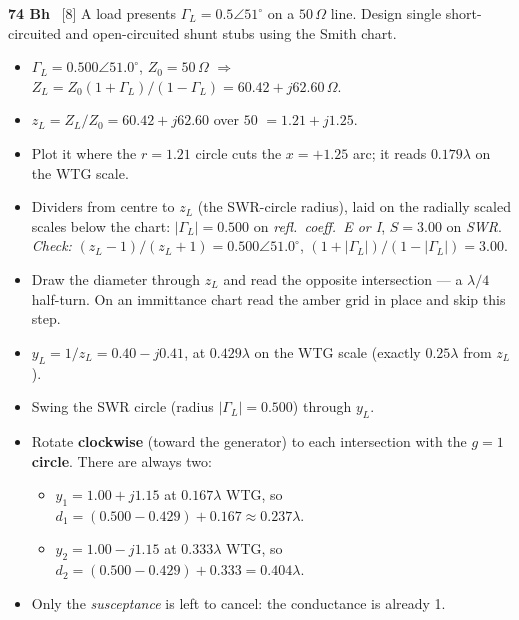 \begin{asked}{\textbf{74 Bh} \ [8]}
A load presents $\Gamma_L = 0.5\angle 51^\circ$ on a $50\,\Omega$ line. Design single short-circuited and open-circuited shunt stubs using the Smith chart.
\end{asked}
\begin{itemize}
  \item $\Gamma_L = 0.500\angle 51.0^\circ$, $Z_0 = 50\,\Omega$ $\Rightarrow$ $Z_L = Z_0(1+\Gamma_L)/(1-\Gamma_L) = 60.42 + j62.60\,\Omega$.
\end{itemize}
\begin{itemize}
  \item $z_L = Z_L/Z_0 = 60.42 + j62.60$ over $50$ $=1.21 + j1.25$.
  \item Plot it where the $r = 1.21$ circle cuts the $x = +1.25$ arc; it reads $0.179\lambda$ on the WTG scale.
  \item Dividers from centre to $z_L$ (the SWR-circle radius), laid on the radially scaled scales below the chart: $|\Gamma_L| = 0.500$ on \emph{refl.\ coeff.\ E or I}, $S = 3.00$ on \emph{SWR}. \textit{Check:} $(z_L-1)/(z_L+1) = 0.500\angle 51.0^\circ$, $(1+|\Gamma_L|)/(1-|\Gamma_L|) = 3.00$.
\end{itemize}
\begin{itemize}
  \item Draw the diameter through $z_L$ and read the opposite intersection --- a $\lambda/4$ half-turn. On an immittance chart read the amber grid in place and skip this step.
  \item $y_L = 1/z_L = 0.40 - j0.41$, at $0.429\lambda$ on the WTG scale (exactly $0.25\lambda$ from $z_L$).
\end{itemize}
\begin{itemize}
  \item Swing the SWR circle (radius $|\Gamma_L| = 0.500$) through $y_L$.
  \item Rotate \textbf{clockwise} (toward the generator) to each intersection with the \textbf{$g=1$ circle}. There are always two:
  \begin{itemize}
    \item $y_1 = 1.00 + j1.15$ at $0.167\lambda$ WTG, so $d_1 = (0.500 - 0.429) + 0.167 \approx 0.237\lambda$.
    \item $y_2 = 1.00 - j1.15$ at $0.333\lambda$ WTG, so $d_2 = (0.500 - 0.429) + 0.333 = 0.404\lambda$.
  \end{itemize}
  \item Only the \emph{susceptance} is left to cancel: the conductance is already 1.
\end{itemize}
